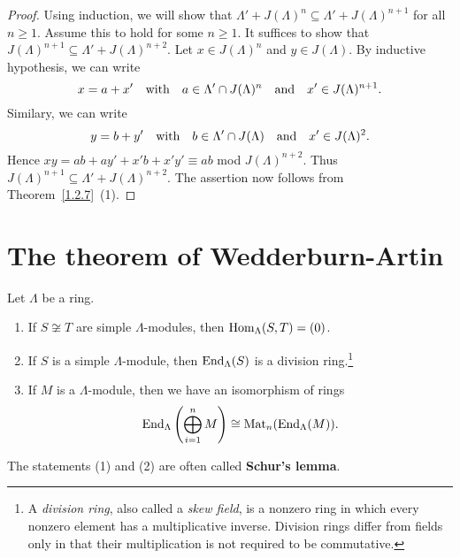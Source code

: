 \begin{proof}\label{1.2.8}
Using induction, we will show that $\Lambda'+J(\Lambda)^{n}\subseteq \Lambda' + J(\Lambda)^{n+1}$ for all $n\ge 1$. Assume this to hold for some $n\ge 1$. It suffices to show that $J(\Lambda)^{n+1}\subseteq \Lambda' + J(\Lambda)^{n+2}$. Let $x\in J(\Lambda)^{n}$ and $y\in J(\Lambda)$. By inductive hypothesis, we can write
\[
x=a+x' \quad\text{with}\quad a \in \Lambda'\cap J(\Lambda)^{n} \quad\text{and}\quad x'\in J(\Lambda)^{n+1}.
\]
Similary, we can write
\[
y=b+y' \quad\text{with}\quad b \in \Lambda'\cap J(\Lambda) \quad\text{and}\quad x'\in J(\Lambda)^{2}.
\]
Hence $xy = ab + ay' + x'b + x'y' \equiv ab$ mod $J(\Lambda)^{n+2}$. Thus $J(\Lambda)^{n+1}\subseteq \Lambda' + J(\Lambda)^{n+2}$. The assertion now follows from Theorem~\ref{1.2.7}~(1).
\end{proof}


\section{The theorem of Wedderburn-Artin}


\begin{lemma}\label{1.3.1}
Let $\Lambda$ be a ring.
\begin{enumerate}
\item If $S\not \cong T$ are simple $\Lambda$-modules, then $\operatorname{Hom}_\Lambda(S,T)=(0)$.
\item If $S$ is a simple $\Lambda$-module, then $\operatorname{End}_\Lambda(S)$ is a division ring.\footnote{A \textit{division ring}, also called a \textit{skew field}, is a nonzero ring in which every nonzero element has a multiplicative inverse. Division rings differ from fields only in that their multiplication is not required to be commutative.}
\item If $M$ is a $\Lambda$-module, then we have an isomorphism of rings
\[
\operatorname{End}_\Lambda\left(\bigoplus_{i=1}^n M\right) \cong \operatorname{Mat}_n(\operatorname{End}_\Lambda(M)).
\]
\end{enumerate}
\end{lemma}


The statements (1) and (2) are often called \textbf{Schur's lemma}.


